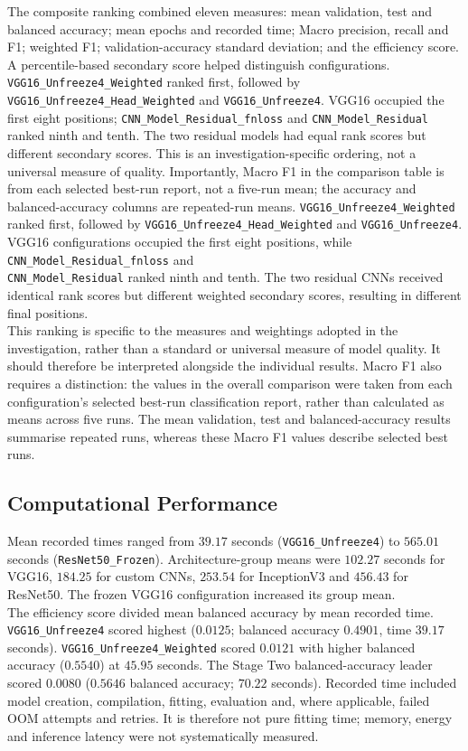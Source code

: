 \documentclass[10pt, a4paper]{article}
\let\oldsubsection\subsection
\renewcommand{\subsection}{%
    \Needspace{4\baselineskip}%
    \oldsubsection
}
\begin{document}
				The composite ranking combined eleven measures: mean validation, test and balanced accuracy; mean epochs and recorded time; Macro precision, recall and F1; weighted F1; validation-accuracy standard deviation; and the efficiency score. A percentile-based secondary score helped distinguish configurations. \texttt{VGG16\_Unfreeze4\_Weighted} ranked first, followed by \texttt{VGG16\_Unfreeze4\_Head\_Weighted} and \texttt{VGG16\_Unfreeze4}. VGG16 occupied the first eight positions; \texttt{CNN\_Model\_Residual\_fnloss} and \texttt{CNN\_Model\_Residual} ranked ninth and tenth. The two residual models had equal rank scores but different secondary scores. This is an investigation-specific ordering, not a universal measure of quality. Importantly, Macro F1 in the comparison table is from each selected best-run report, not a five-run mean; the accuracy and balanced-accuracy columns are repeated-run means.
				\texttt{VGG16\_Unfreeze4\_Weighted} ranked first, followed by \texttt{VGG16\_Unfreeze4\_Head\_Weighted} and \texttt{VGG16\_Unfreeze4}. VGG16 configurations occupied the first eight positions, while \texttt{CNN\_Model\_Residual\_fnloss} and \\\texttt{CNN\_Model\_Residual} ranked ninth and tenth. The two residual CNNs received identical rank scores but different weighted secondary scores, resulting in different final positions.\\
				This ranking is specific to the measures and weightings adopted in the investigation, rather than a standard or universal measure of model quality. It should therefore be interpreted alongside the individual results. Macro F1 also requires a distinction: the values in the overall comparison were taken from each configuration's selected best-run classification report, rather than calculated as means across five runs. The mean validation, test and balanced-accuracy results summarise repeated runs, whereas these Macro F1 values describe selected best runs.
				
		\subsection{Computational Performance}
			
			Mean recorded times ranged from $39.17$ seconds (\texttt{VGG16\_Unfreeze4}) to $565.01$ seconds (\texttt{ResNet50\_Frozen}). Architecture-group means were $102.27$ seconds for VGG16, $184.25$ for custom CNNs, $253.54$ for InceptionV3 and $456.43$ for ResNet50. The frozen VGG16 configuration increased its group mean.\\
			The efficiency score divided mean balanced accuracy by mean recorded time. \texttt{VGG16\_Unfreeze4} scored highest ($0.0125$; balanced accuracy $0.4901$, time $39.17$ seconds). \texttt{VGG16\_Unfreeze4\_Weighted} scored $0.0121$ with higher balanced accuracy ($0.5540$) at $45.95$ seconds. The Stage Two balanced-accuracy leader scored $0.0080$ ($0.5646$ balanced accuracy; $70.22$ seconds). Recorded time included model creation, compilation, fitting, evaluation and, where applicable, failed OOM attempts and retries. It is therefore not pure fitting time; memory, energy and inference latency were not systematically measured.
	
\end{document}
